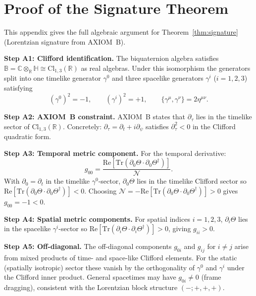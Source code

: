 \documentclass[12pt,a4paper]{article}
\theoremstyle{definition}
\theoremstyle{remark}
\begin{document}

\appendix

\section{Proof of the Signature Theorem}
\label{app:signature}

This appendix gives the full algebraic argument for
Theorem~\ref{thm:signature} (Lorentzian signature from AXIOM~B).

\textbf{Step A1: Clifford identification.}
The biquaternion algebra satisfies
$\mathbb{B}=\mathbb{C}\otimes_{\mathbb{R}}\mathbb{H}\cong\mathrm{Cl}_{1,3}(\mathbb{R})$
as real algebras.  Under this isomorphism the generators split into one
timelike generator $\gamma^0$ and three spacelike generators $\gamma^i$
($i=1,2,3$) satisfying
\[
  (\gamma^0)^2 = -1, \qquad (\gamma^i)^2 = +1, \qquad
  \{\gamma^\mu,\gamma^\nu\} = 2\eta^{\mu\nu}.
\]

\textbf{Step A2: AXIOM~B constraint.}
AXIOM~B states that $\partial_\tau$ lies in the timelike sector of
$\mathrm{Cl}_{1,3}(\mathbb{R})$.  Concretely:
$\partial_\tau = \partial_t + i\partial_\psi$ satisfies
$\partial_\tau^2 < 0$ in the Clifford quadratic form.

\textbf{Step A3: Temporal metric component.}
For the temporal derivative:
\[
  g_{00} = \frac{\mathrm{Re}[\mathrm{Tr}(\partial_0\Theta\cdot\partial_0\Theta^\dagger)]}{\mathcal{N}}.
\]
With $\partial_0 = \partial_t$ in the timelike $\gamma^0$-sector,
$\partial_0\Theta$ lies in the timelike Clifford sector so
$\mathrm{Re}[\mathrm{Tr}(\partial_0\Theta\cdot\partial_0\Theta^\dagger)] < 0$.
Choosing $\mathcal{N} = -\mathrm{Re}[\mathrm{Tr}(\partial_0\Theta\cdot\partial_0\Theta^\dagger)] > 0$
gives $g_{00} = -1 < 0$.

\textbf{Step A4: Spatial metric components.}
For spatial indices $i=1,2,3$, $\partial_i\Theta$ lies in the spacelike
$\gamma^i$-sector so
$\mathrm{Re}[\mathrm{Tr}(\partial_i\Theta\cdot\partial_i\Theta^\dagger)]>0$,
giving $g_{ii}>0$.

\textbf{Step A5: Off-diagonal.}
The off-diagonal components $g_{0i}$ and $g_{ij}$ for $i\neq j$ arise from
mixed products of time- and space-like Clifford elements.  For the
static (spatially isotropic) sector these vanish by the orthogonality of
$\gamma^0$ and $\gamma^i$ under the Clifford inner product.  General
spacetimes may have $g_{0i}\neq 0$ (frame dragging), consistent with
the Lorentzian block structure $(-;+,+,+)$.
\end{document}
